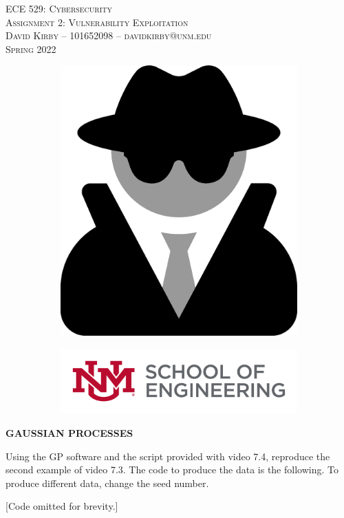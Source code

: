 \documentclass[11pt]{article}
\begin{document}
\setmainfont{SF Pro Text}
\setsansfont{SF Pro Text}
\setmonofont{SF Mono}
\renewcommand{\familydefault}{\sfdefault}

\thispagestyle{empty}
\begin{titlepage}
\vspace*{\fill}
\begin{center}
\textsc{\Huge{ECE 529: Cybersecurity}}\\[3em]
\textsc{\LARGE Assignment 2: Vulnerability Exploitation}\\[6em]
\textsc{\Large David Kirby -- 101652098 -- davidkirby@unm.edu}\\[3em]
\textsc{\Large Spring 2022}
\end{center}
\vfill
\begin{figure}[h]
\begin{subfigure}{0.5\textwidth}
\includegraphics[width=0.20\linewidth]{cybersecurity.png}
\end{subfigure}
\begin{subfigure}{0.6\textwidth}\hspace{1em}
\includegraphics[width=0.8\linewidth]{new-soe-logo.png}
\end{subfigure}
\end{figure}
\end{titlepage}
\setcounter{figure}{0}

\hypersetup{
    linkcolor=CrispBlue,
    urlcolor=CrispBlue,
    breaklinks=true
}

\textbf{GAUSSIAN PROCESSES}

Using the GP software and the script provided with video 7.4, reproduce the second example of video 7.3. The code to produce the data is the following. To produce different data, change the seed number.

[Code omitted for brevity.]


\end{document}
